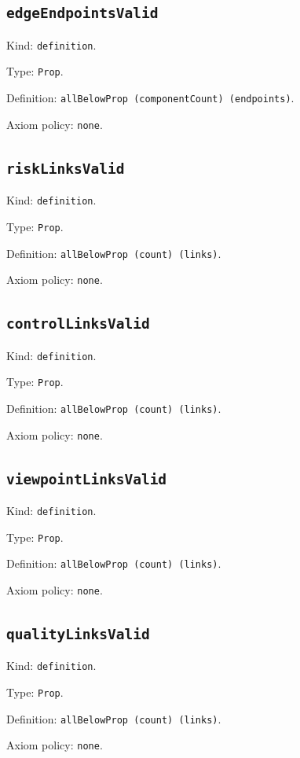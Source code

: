 \documentclass[11pt]{article}
\begin{document}
\subsection*{\texttt{edgeEndpointsValid}}
\noindent Kind: \texttt{definition}.\par
\noindent Type: \texttt{Prop}.\par
\noindent Definition: \texttt{allBelowProp (componentCount) (endpoints)}.\par
\noindent Axiom policy: \texttt{none}.\par
\subsection*{\texttt{riskLinksValid}}
\noindent Kind: \texttt{definition}.\par
\noindent Type: \texttt{Prop}.\par
\noindent Definition: \texttt{allBelowProp (count) (links)}.\par
\noindent Axiom policy: \texttt{none}.\par
\subsection*{\texttt{controlLinksValid}}
\noindent Kind: \texttt{definition}.\par
\noindent Type: \texttt{Prop}.\par
\noindent Definition: \texttt{allBelowProp (count) (links)}.\par
\noindent Axiom policy: \texttt{none}.\par
\subsection*{\texttt{viewpointLinksValid}}
\noindent Kind: \texttt{definition}.\par
\noindent Type: \texttt{Prop}.\par
\noindent Definition: \texttt{allBelowProp (count) (links)}.\par
\noindent Axiom policy: \texttt{none}.\par
\subsection*{\texttt{qualityLinksValid}}
\noindent Kind: \texttt{definition}.\par
\noindent Type: \texttt{Prop}.\par
\noindent Definition: \texttt{allBelowProp (count) (links)}.\par
\noindent Axiom policy: \texttt{none}.\par
\end{document}
